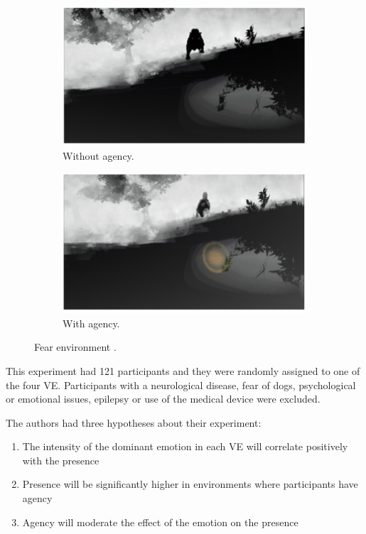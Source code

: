 \begin{figure}[!h] 
    \begin{subfigure}{0.45\textwidth}
    \centering
    \includegraphics[width=\textwidth]{Revisao/Emotion Presence/Scene Fear No.png}
    \caption{Without agency.} 
    \label{fig:fear_without}
  \end{subfigure}
  \hfill
  \begin{subfigure}{0.45\textwidth}
    \centering
    \includegraphics[width=\textwidth]{Revisao/Emotion Presence/Scene Fear Yes.png}
    \caption{With agency.} 
    \label{fig:fear_with}
  \end{subfigure}
\caption{Fear environment \cite{jicol2021effects}.} 
\label{fig:fear_environment}
\end{figure}

This experiment had 121 participants and they were randomly assigned to one of the four VE. Participants with a neurological disease, fear of dogs, psychological or emotional issues, epilepsy or use of the medical device were excluded.

The authors had three hypotheses about their experiment:
\begin{enumerate}
    \item The intensity of the dominant emotion in each VE will correlate positively with the presence
    \item Presence will be significantly higher in environments where participants have agency
    \item Agency will moderate the effect of the emotion on the presence
\end{enumerate}

